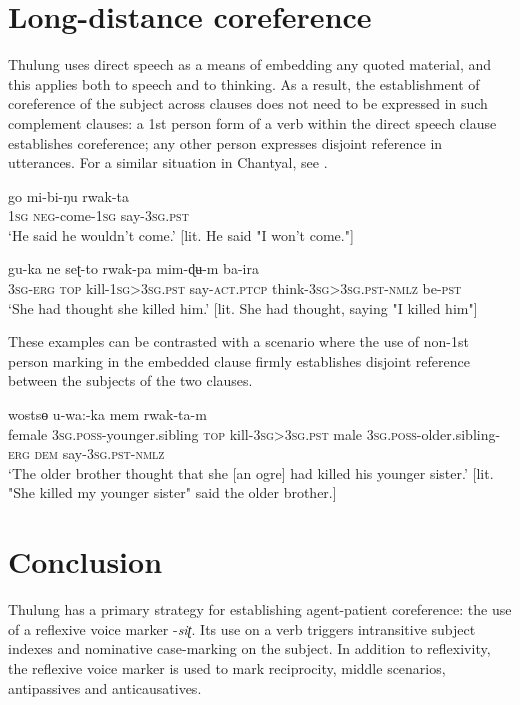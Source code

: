 \documentclass[output=paper]{langscibook}
\begin{document}
\section{Long-distance coreference}
\label{sec:Lahaussois:7}

Thulung uses direct speech as a means of embedding any quoted material, and this applies both to speech and to thinking. As a result, the establishment of coreference of the subject across clauses does not need to be expressed in such complement clauses: a 1st person form of a verb within the direct speech clause establishes coreference; any other person expresses disjoint reference in utterances. For a similar situation in Chantyal, see \citet{Noonan2006}.

\ea%
    \label{ex:Lahaussois:47}
    \gll go mi-bi-ŋu rwak-ta\\
        \textsc{1sg} \textsc{neg}{}-come-\textsc{1sg} say-\textsc{3sg.pst}\\
    \glt ‘He said he wouldn't come.' [lit. He said "I won't come."]
    \z


\ea%
    \label{ex:Lahaussois:48}
    \gll gu-ka ne seʈ-to rwak-pa mim-ɖʉ{}-m ba-ira \\
        \textsc{3sg-erg} \textsc{top} kill-\textsc{1sg>3sg.pst} say-\textsc{act.ptcp} think-\textsc{3sg>3sg.pst-nmlz} be-\textsc{pst} \\
    \glt ‘She had thought she killed him.' [lit. She had thought, saying "I killed him"]
    \z

These examples can be contrasted with a scenario where the use of non-1st person marking in the embedded clause firmly establishes disjoint reference between the subjects of the two clauses.

\ea%
    \label{ex:Lahaussois:49}
     wostsɵ u-wa:-ka mem rwak-ta-m\\
        female \textsc{3sg.poss}{}-younger.sibling \textsc{top} kill-\textsc{3sg>3sg.pst} male \textsc{3sg.poss}{}-older.sibling-\textsc{erg} \textsc{dem}  say-\textsc{3sg.pst-nmlz}\\
    \glt ‘The older brother thought that she [an ogre] had killed his younger sister.' [lit. "She   killed my younger sister" said the older brother.]
    \z


\section{Conclusion}
\label{sec:Lahaussois:8}

Thulung has a primary strategy for establishing agent-patient coreference: the use of a reflexive voice marker -\textit{siʈ}. Its use on a verb triggers intransitive subject indexes and nominative case-marking on the subject. In addition to reflexivity, the reflexive voice marker is used to mark reciprocity, middle scenarios, antipassives and anticausatives.  
\end{document}
